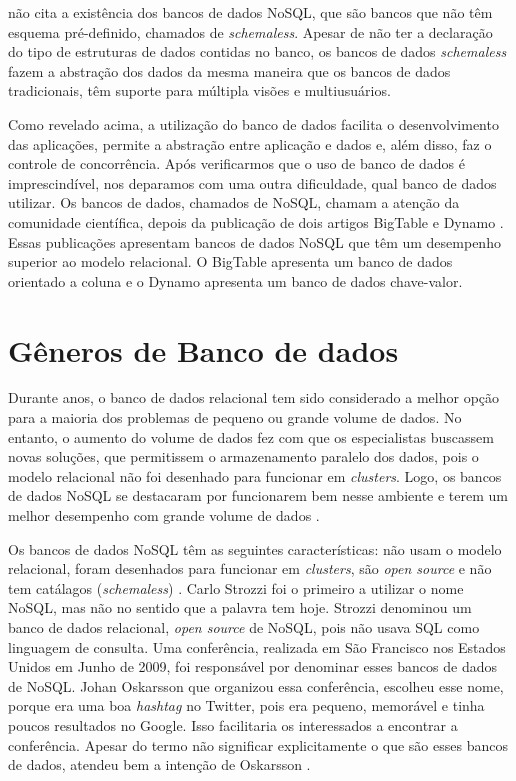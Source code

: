  não cita a existência dos bancos de dados NoSQL, que são bancos que não têm esquema pré-definido, chamados de \textit{schemaless}. Apesar de não ter a declaração do tipo de estruturas de dados contidas no banco, os bancos de dados \textit{schemaless} fazem a abstração dos dados da mesma maneira que os bancos de dados tradicionais, têm suporte para múltipla visões e multiusuários.

Como revelado acima, a utilização do banco de dados facilita o desenvolvimento das aplicações, permite a abstração entre aplicação e dados e, além disso, faz o controle de concorrência. Após verificarmos que o uso de banco de dados é imprescindível, nos deparamos com uma outra dificuldade, qual banco de dados utilizar. Os bancos de dados, chamados de NoSQL, chamam a atenção da comunidade científica, depois da publicação de dois artigos BigTable \cite{bigtable} e Dynamo \cite{dynamo}. Essas publicações apresentam bancos de dados NoSQL que têm um desempenho superior ao modelo relacional. O BigTable apresenta um banco de dados orientado a coluna e o Dynamo apresenta um banco de dados chave-valor.

\section{Gêneros de Banco de dados}
\label{sec:databasetype}
Durante anos, o banco de dados relacional tem sido considerado a melhor opção para a maioria dos problemas de pequeno ou grande volume de dados. No entanto, o aumento do volume de dados fez com que os especialistas buscassem novas soluções, que permitissem o armazenamento paralelo dos dados, pois o modelo relacional não foi desenhado para funcionar em \textit{clusters}. Logo, os bancos de dados NoSQL se destacaram por funcionarem bem nesse ambiente e terem um melhor desempenho com grande volume de dados \cite{NoSQL}.

Os bancos de dados NoSQL têm as seguintes características: não usam o modelo relacional, foram desenhados para funcionar em \textit{clusters}, são \textit{open source} e não tem catálagos (\textit{schemaless}) \cite{NoSQL}. Carlo Strozzi foi o primeiro a utilizar o nome NoSQL, mas não no sentido que a palavra tem hoje. Strozzi denominou um banco de dados relacional, \textit{open source} de NoSQL, pois não usava \ac{SQL} como linguagem de consulta. Uma conferência, realizada em São Francisco nos Estados Unidos em Junho de 2009, foi responsável por denominar esses bancos de dados de NoSQL. Johan Oskarsson que organizou essa conferência, escolheu esse nome, porque era uma boa \textit{hashtag} no Twitter, pois era pequeno, memorável e tinha poucos resultados no Google. Isso facilitaria os interessados a encontrar a conferência. Apesar do termo não significar explicitamente o que são esses bancos de dados, atendeu bem a intenção de Oskarsson \cite{NoSQL}.


